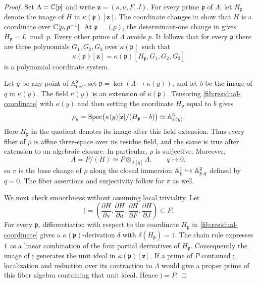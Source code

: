 \begin{proof}
Set $\Lambda=\mathbb C[p]$ and write $\mathbf z=(s,u,F,J)$. For every prime
$\mathfrak p$ of $\Lambda$, let $H_{\mathfrak p}$ denote the image of $H$ in
$\kappa(\mathfrak p)[\mathbf z]$. The coordinate changes in
 show that $H$ is a
coordinate over $\mathbb C[p,p^{-1}]$. At $\mathfrak p=(p)$, the determinant-one
change in  gives
$H_{\mathfrak p}=L\bmod p$. Every other prime of $\Lambda$ avoids $p$.
It follows that
for every $\mathfrak p$ there are three polynomials $G_1,G_2,G_3$ over
$\kappa(\mathfrak p)$ such that
\begin{equation}\label{fib:residual-coordinate}
 \kappa(\mathfrak p)[\mathbf z]
 =\kappa(\mathfrak p)[H_{\mathfrak p},G_1,G_2,G_3]
\end{equation}
is a polynomial coordinate system.

Let $y$ be any point of $\mathbb A^2_{p,q}$, set
$\mathfrak p=\ker(\Lambda\to\kappa(y))$, and let $b$ be the image of $q$ in
$\kappa(y)$. The field $\kappa(y)$ is an extension of
$\kappa(\mathfrak p)$. Tensoring \eqref{fib:residual-coordinate} with
$\kappa(y)$ and then setting the coordinate $H_{\mathfrak p}$ equal to
$b$ gives
\[
 \rho_y
 =\operatorname{Spec}\bigl(\kappa(y)[\mathbf z]/(H_{\mathfrak p}-b)\bigr)
 \simeq\mathbb A^3_{\kappa(y)}.
\]
Here $H_{\mathfrak p}$ in the quotient denotes its image after this
field extension. Thus every fiber of $\rho$ is affine three-space over
its residue field, and the same is true after extension to an algebraic
closure. In particular, $\rho$ is surjective. Moreover,
\[
 A=P/(H)\simeq P\otimes_{\Lambda[q]}\Lambda,
 \qquad q\longmapsto0,
\]
so $\pi$ is the base change of $\rho$ along the closed immersion
$\mathbb A^1_p\hookrightarrow\mathbb A^2_{p,q}$ defined by $q=0$. The fiber
assertions and surjectivity follow for $\pi$ as well.

We next check smoothness without assuming local triviality. Let
\[
 \mathfrak j=
 \left(\frac{\partial H}{\partial s},
       \frac{\partial H}{\partial u},
       \frac{\partial H}{\partial F},
       \frac{\partial H}{\partial J}\right)\subset P.
\]
For every $\mathfrak p$, differentiation with respect to the coordinate
$H_{\mathfrak p}$ in \eqref{fib:residual-coordinate} gives a
$\kappa(\mathfrak p)$-derivation $\delta$ with
$\delta(H_{\mathfrak p})=1$. The chain rule expresses $1$ as a linear
combination of the four partial derivatives of $H_{\mathfrak p}$.
Consequently the image of $\mathfrak j$ generates the unit ideal in
$\kappa(\mathfrak p)[\mathbf z]$. If a prime of $P$ contained
$\mathfrak j$, localization and reduction over its contraction to $\Lambda$
would give a proper prime of this fiber algebra containing that unit
ideal. Hence $\mathfrak j=P$.


\end{proof}

